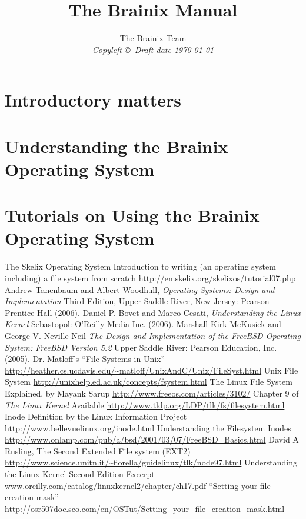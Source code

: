 \documentclass{book}
\title{The Brainix Manual}
\author{The Brainix Team  \\
{\small\em Copyleft \copyright \ Draft date \today }}
\date{ }
\begin{document}


\maketitle
\tableofcontents

%
\part{Introductory matters}

\part{Understanding the Brainix Operating System}

\part{Tutorials on Using the Brainix Operating System}





{}
\begin{thebibliography}{10}
 The Skelix Operating System Introduction to writing (an operating system including) a file system from scratch \url{http://en.skelix.org/skelixos/tutorial07.php}
 Andrew Tanenbaum and Albert Woodhull, \textit{Operating Systems: Design and Implementation} Third Edition, Upper Saddle River, New Jersey: Pearson Prentice Hall (2006).
 Daniel P. Bovet and Marco Cesati, \textit{Understanding the Linux Kernel} Sebastopol: O'Reilly Media Inc. (2006).
 Marshall Kirk McKusick and George V. Neville-Neil \textit{The Design and Implementation of the FreeBSD Operating System: FreeBSD Version 5.2} Upper Saddle River: Pearson Education, Inc. (2005).
 Dr. Matloff's ``File Systems in Unix'' \url{http://heather.cs.ucdavis.edu/~matloff/UnixAndC/Unix/FileSyst.html} 
 Unix File System \url{http://unixhelp.ed.ac.uk/concepts/fsystem.html}
 The Linux File System Explained, by Mayank Sarup \url{http://www.freeos.com/articles/3102/}
 Chapter 9 of \textit{The Linux Kernel} Available \url{http://www.tldp.org/LDP/tlk/fs/filesystem.html}
 Inode Definition by the Linux Information Project \url{http://www.bellevuelinux.org/inode.html}
 Understanding the Filesystem Inodes \url{http://www.onlamp.com/pub/a/bsd/2001/03/07/FreeBSD_Basics.html}
 David A Rusling, The Second Extended File system (EXT2) \url{http://www.science.unitn.it/~fiorella/guidelinux/tlk/node97.html}
 Understanding the Linux Kernel Second Edition Excerpt \url{www.oreilly.com/catalog/linuxkernel2/chapter/ch17.pdf}
 ``Setting your file creation mask'' \url{http://osr507doc.sco.com/en/OSTut/Setting_your_file_creation_mask.html}

\end{thebibliography}
\end{document}
